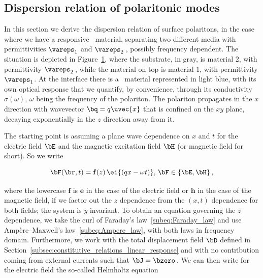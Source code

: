 \subsection{Dispersion relation of polaritonic modes}
\label{subsec:polaritonics_dispersion_relation}

In this section we derive the dispersion relation of surface polaritons, in the case where we have a responsive \bd~material, separating two different media with permittivities $\vareps_1$ and $\vareps_2$\,, possibly frequency dependent.
The situation is depicted in Figure~\ref{fig:cladded_monolayer}, where the substrate, in gray, is material 2, with permittivity $\vareps_2$\,, while the material on top is material 1, with permittivity $\vareps_1$.
At the interface there is a \bd~material represented in light blue, with its own optical response that we quantify, by convenience, through its conductivity $\sigma(\omega)$, $\omega$ being the frequency of the polariton.
The polariton propagates in the $x$ direction with wavevector $\bq = q \uvec{x}$ that is confined on the $xy$ plane, decaying exponentially in the $z$ direction away from it.

\begin{figure}[H]
    \centering
    
    \label{fig:cladded_monolayer}
\end{figure}

The starting point is assuming a plane wave dependence on $x$ and $t$ for the electric field $\bE$ and the magnetic excitation field $\bH$ (or magnetic field for short).
So we write

\begin{equation}
    \bF(\br, t)  = \mathbf{f}(z) \, \ei{(q x - \omega t)}, \,\bF \in \{\bE, \bH\}\,,
    \label{eq:oscillatory_electric_field}
\end{equation}

\noindent where the lowercase $\mathbf{f}$ is $\mathbf{e}$ in the case of the electric field or $\mathbf{h}$ in the case of the magnetic field, if we factor out the $z$ dependence from the $(x,t)$ dependence for both fields; the system is $y$ invariant.
To obtain an equation governing the $z$ dependence, we take the curl of Faraday's law~\eqref{subeq:Faraday_law} and use Amp\`ere--Maxwell's law~\eqref{subeq:Ampere_law}, with both laws in frequency domain.
Furthermore, we work with the total displacement field $\bD$ defined in Section~\ref{subsec:constitutive_relations_linear_response} and with no contribution coming from external currents such that $\bJ = \bzero$\,.
We can then write for the electric field the so-called Helmholtz equation

